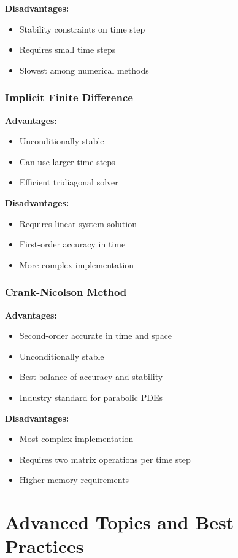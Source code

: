 \documentclass[12pt,a4paper]{article}
\numberwithin{algorithm}{subsection}
\begin{document}
\textbf{Disadvantages:}
\begin{itemize}
\item Stability constraints on time step
\item Requires small time steps
\item Slowest among numerical methods
\end{itemize}

\subsubsection{Implicit Finite Difference}
\textbf{Advantages:}
\begin{itemize}
\item Unconditionally stable
\item Can use larger time steps
\item Efficient tridiagonal solver
\end{itemize}

\textbf{Disadvantages:}
\begin{itemize}
\item Requires linear system solution
\item First-order accuracy in time
\item More complex implementation
\end{itemize}

\subsubsection{Crank-Nicolson Method}
\textbf{Advantages:}
\begin{itemize}
\item Second-order accurate in time and space
\item Unconditionally stable
\item Best balance of accuracy and stability
\item Industry standard for parabolic PDEs
\end{itemize}

\textbf{Disadvantages:}
\begin{itemize}
\item Most complex implementation
\item Requires two matrix operations per time step
\item Higher memory requirements
\end{itemize}

\section{Advanced Topics and Best Practices}
\end{document}
